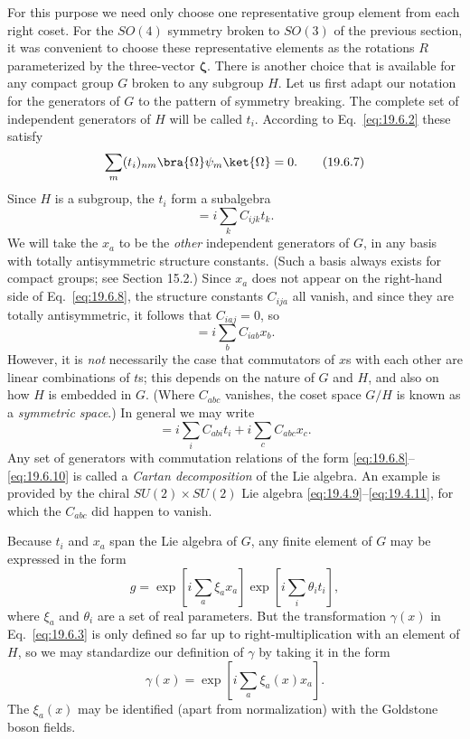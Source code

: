 For this purpose we need only choose one representative group element from each right coset. For the $SO(4)$ symmetry broken to $SO(3)$ of the previous section, it was convenient to choose these representative elements as the rotations $R$ parameterized by the three-vector $\boldsymbol\zeta$. There is another choice that is available for any compact group $G$ broken to any subgroup $H$. Let us first adapt our notation for the generators of $G$ to the pattern of symmetry breaking. The complete set of independent generators of $H$ will be called $t_i$. According to Eq.~\eqref{eq:19.6.2} these satisfy
\begin{equation}
\sum_m(t_i)_{nm}\bra{\Omega}\psi_m\ket{\Omega}=0.
\tag{19.6.7}\label{eq:19.6.7}
\end{equation}
Since $H$ is a subgroup, the $t_i$ form a subalgebra
\begin{equation}
[t_i,t_j]=i\sum_k C_{ijk}t_k.
\tag{19.6.8}\label{eq:19.6.8}
\end{equation}
We will take the $x_a$ to be the \emph{other} independent generators of $G$, in any basis with totally antisymmetric structure constants. (Such a basis always exists for compact groups; see Section 15.2.) Since $x_a$ does not appear on the right-hand side of Eq.~\eqref{eq:19.6.8}, the structure constants $C_{ija}$ all vanish, and since they are totally antisymmetric, it follows that $C_{iaj}=0$, so
\begin{equation}
[t_i,x_a]=i\sum_b C_{iab}x_b.
\tag{19.6.9}\label{eq:19.6.9}
\end{equation}
However, it is \emph{not} necessarily the case that commutators of $x$s with each other are linear combinations of $t$s; this depends on the nature of $G$ and $H$, and also on how $H$ is embedded in $G$. (Where $C_{abc}$ vanishes, the coset space $G/H$ is known as a \emph{symmetric space}.) In general we may write
\begin{equation}
[x_a,x_b]
=i\sum_i C_{abi}t_i+i\sum_c C_{abc}x_c.
\tag{19.6.10}\label{eq:19.6.10}
\end{equation}
Any set of generators with commutation relations of the form \eqref{eq:19.6.8}--\eqref{eq:19.6.10} is called a \emph{Cartan decomposition} of the Lie algebra. An example is provided by the chiral $SU(2)\times SU(2)$ Lie algebra \eqref{eq:19.4.9}--\eqref{eq:19.4.11}, for which the $C_{abc}$ did happen to vanish.

Because $t_i$ and $x_a$ span the Lie algebra of $G$, any finite element of $G$ may be expressed in the form
\begin{equation}
g=\exp\left[i\sum_a\xi_a x_a\right]
\exp\left[i\sum_i\theta_i t_i\right],
\tag{19.6.11}\label{eq:19.6.11}
\end{equation}
where $\xi_a$ and $\theta_i$ are a set of real parameters. But the transformation $\gamma(x)$ in Eq.~\eqref{eq:19.6.3} is only defined so far up to right-multiplication with an element of $H$, so we may standardize our definition of $\gamma$ by taking it in the form
\begin{equation}
\gamma(x)=\exp\left[i\sum_a\xi_a(x)x_a\right].
\tag{19.6.12}\label{eq:19.6.12}
\end{equation}
The $\xi_a(x)$ may be identified (apart from normalization) with the Goldstone boson fields.

